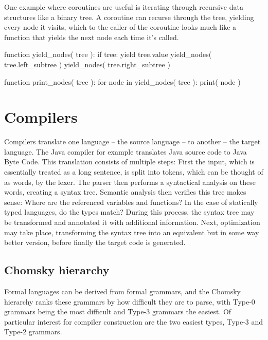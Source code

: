 		One example where coroutines are useful is iterating through recursive data structures like a binary tree. A coroutine can recurse through the tree, yielding every node it visits, which to the caller of the coroutine looks much like a function that yields the next node each time it's called.
		
		\begin{codelisting}[caption={Pseudocode of tree iteration using coroutines}]
function yield_nodes( tree ):
    if tree:
        yield tree.value
        yield_nodes( tree.left_subtree )
        yield_nodes( tree.right_subtree )

function print_nodes( tree ):
    for node in yield_nodes( tree ):
        print( node )
		\end{codelisting}
	
	\section{Compilers}
	
	
		Compilers translate one language -- the source language -- to another -- the target language. The Java compiler for example translates Java source code to Java Byte Code. This translation consists of multiple steps: First the input, which is essentially treated as a long sentence, is split into tokens, which can be thought of as words, by the lexer. The parser then performs a syntactical analysis on these words, creating a syntax tree. Semantic analysis then verifies this tree makes sense: Where are the referenced variables and functions? In the case of statically typed languages, do the types match? During this process, the syntax tree may be transformed and annotated it with additional information. Next, optimization may take place, transforming the syntax tree into an equivalent but in some way better version, before finally the target code is generated.

		\subsection{Chomsky hierarchy}
			
			Formal languages can be derived from formal grammars, and the Chomsky hierarchy ranks these grammars by how difficult they are to parse, with Type-0 grammars being the most difficult and Type-3 grammars the easiest. Of particular interest for compiler construction are the two easiest types, Type-3 and Type-2 grammars.
			
